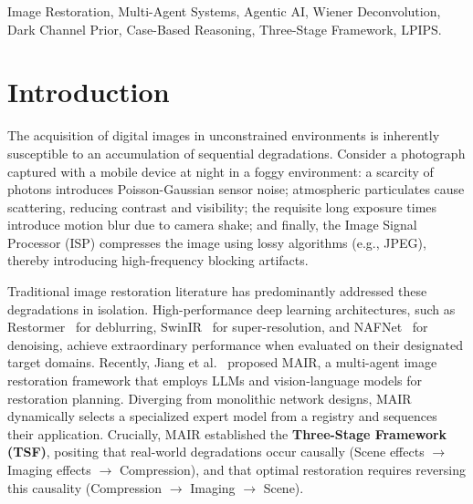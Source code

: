 \documentclass[journal, 10pt]{IEEEtran}
\begin{document}
\begin{IEEEkeywords}
Image Restoration, Multi-Agent Systems, Agentic AI, Wiener Deconvolution, Dark Channel Prior, Case-Based Reasoning, Three-Stage Framework, LPIPS.
\end{IEEEkeywords}

\section{Introduction}

The acquisition of digital images in unconstrained environments is inherently susceptible to an accumulation of sequential degradations. Consider a photograph captured with a mobile device at night in a foggy environment: a scarcity of photons introduces Poisson-Gaussian sensor noise; atmospheric particulates cause scattering, reducing contrast and visibility; the requisite long exposure times introduce motion blur due to camera shake; and finally, the Image Signal Processor (ISP) compresses the image using lossy algorithms (e.g., JPEG), thereby introducing high-frequency blocking artifacts. 

Traditional image restoration literature has predominantly addressed these degradations in isolation. High-performance deep learning architectures, such as Restormer~\cite{zamir2022restormer} for deblurring, SwinIR~\cite{liang2021swinir} for super-resolution, and NAFNet~\cite{chen2022nafnet} for denoising, achieve extraordinary performance when evaluated on their designated target domains. Recently, Jiang et al.~\cite{jiang2026mair} proposed MAIR, a multi-agent image restoration framework that employs LLMs and vision-language models for restoration planning. Diverging from monolithic network designs, MAIR dynamically selects a specialized expert model from a registry and sequences their application. Crucially, MAIR established the \textbf{Three-Stage Framework (TSF)}, positing that real-world degradations occur causally (Scene effects $\to$ Imaging effects $\to$ Compression), and that optimal restoration requires reversing this causality (Compression $\to$ Imaging $\to$ Scene).
\end{document}
